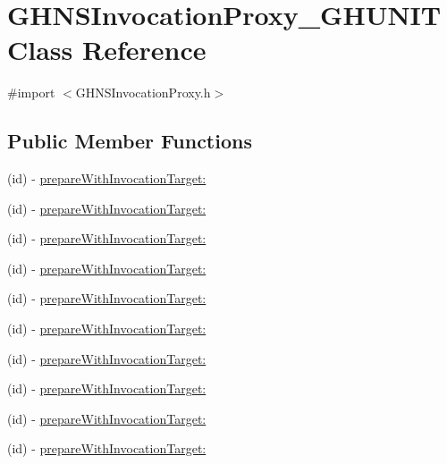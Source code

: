 \hypertarget{interface_g_h_n_s_invocation_proxy___g_h_u_n_i_t}{
\section{\-G\-H\-N\-S\-Invocation\-Proxy\-\_\-\-G\-H\-U\-N\-I\-T \-Class \-Reference}
\label{interface_g_h_n_s_invocation_proxy___g_h_u_n_i_t}
}


{\ttfamily \#import $<$\-G\-H\-N\-S\-Invocation\-Proxy.\-h$>$}

\subsection*{\-Public \-Member \-Functions}
\begin{DoxyCompactItemize}
\item 
(id) -\/ \hyperlink{interface_g_h_n_s_invocation_proxy___g_h_u_n_i_t_a3b6d608110e5a25387305a99a2bc17e5}{prepare\-With\-Invocation\-Target\-:}
\item 
(id) -\/ \hyperlink{interface_g_h_n_s_invocation_proxy___g_h_u_n_i_t_a3b6d608110e5a25387305a99a2bc17e5}{prepare\-With\-Invocation\-Target\-:}
\item 
(id) -\/ \hyperlink{interface_g_h_n_s_invocation_proxy___g_h_u_n_i_t_a3b6d608110e5a25387305a99a2bc17e5}{prepare\-With\-Invocation\-Target\-:}
\item 
(id) -\/ \hyperlink{interface_g_h_n_s_invocation_proxy___g_h_u_n_i_t_a3b6d608110e5a25387305a99a2bc17e5}{prepare\-With\-Invocation\-Target\-:}
\item 
(id) -\/ \hyperlink{interface_g_h_n_s_invocation_proxy___g_h_u_n_i_t_a3b6d608110e5a25387305a99a2bc17e5}{prepare\-With\-Invocation\-Target\-:}
\item 
(id) -\/ \hyperlink{interface_g_h_n_s_invocation_proxy___g_h_u_n_i_t_a3b6d608110e5a25387305a99a2bc17e5}{prepare\-With\-Invocation\-Target\-:}
\item 
(id) -\/ \hyperlink{interface_g_h_n_s_invocation_proxy___g_h_u_n_i_t_a3b6d608110e5a25387305a99a2bc17e5}{prepare\-With\-Invocation\-Target\-:}
\item 
(id) -\/ \hyperlink{interface_g_h_n_s_invocation_proxy___g_h_u_n_i_t_a3b6d608110e5a25387305a99a2bc17e5}{prepare\-With\-Invocation\-Target\-:}
\item 
(id) -\/ \hyperlink{interface_g_h_n_s_invocation_proxy___g_h_u_n_i_t_a3b6d608110e5a25387305a99a2bc17e5}{prepare\-With\-Invocation\-Target\-:}
\item 
(id) -\/ \hyperlink{interface_g_h_n_s_invocation_proxy___g_h_u_n_i_t_a3b6d608110e5a25387305a99a2bc17e5}{prepare\-With\-Invocation\-Target\-:}
\end{DoxyCompactItemize}
